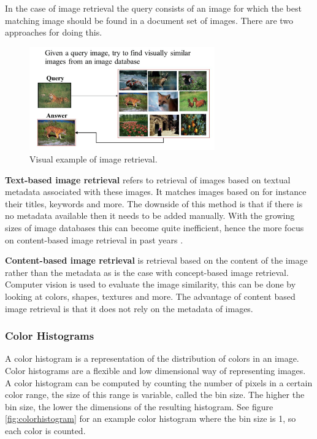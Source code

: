 \documentclass{article}
\begin{document}
In the case of image retrieval the query consists of an image for which the best matching image should be found in a document set of images. There are two approaches for doing this.

\begin{figure}[H]
	\includegraphics[width=8cm]{images/imageretrieval.png}
	\centering
	\caption{Visual example of image retrieval.}
	\label{fig:imageretrieval}
\end{figure}

\textbf{Text-based image retrieval} refers to retrieval of images based on textual metadata associated with these images. It matches images based on for instance their titles, keywords and more. The downside of this method is that if there is no metadata available then it needs to be added manually. With the growing sizes of image databases this can become quite inefficient, hence the more focus on content-based image retrieval in past years \cite{rajam2013survey}.

\textbf{Content-based image retrieval} is retrieval based on the content of the image rather than the metadata as is the case with concept-based image retrieval. Computer vision is used to evaluate the image similarity, this can be done by looking at colors, shapes, textures and more. The advantage of content based image retrieval is that it does not rely on the metadata of images.

\subsubsection{Color Histograms}
A color histogram is a representation of the distribution of colors in an image. Color histograms are a flexible and low dimensional way of representing images. A color histogram can be computed by counting the number of pixels in a certain color range, the size of this range is variable, called the bin size. The higher the bin size, the lower the dimensions of the resulting histogram. See figure \ref{fig:colorhistogram} for an example color histogram where the bin size is 1, so each color is counted. 
\end{document}
